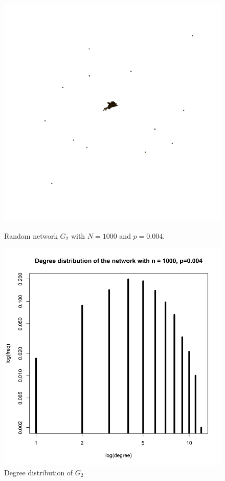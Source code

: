 \documentclass[draftcls,12pt,onecolumn]{IEEEtran}
\begin{document}
\begin{figure}[H]
\centering
\begin{minipage}[t]{0.48\textwidth}
\centering
\includegraphics[scale=0.2]{figures_part1_1/output_4_0.png}
\caption{Random network $G_2$ with $N=1000$ and $p=0.004$.}
\label{fig3}
\end{minipage}
\begin{minipage}[t]{0.48\textwidth}
\centering
\includegraphics[scale=0.2]{figures_part1_1/output_9_0.png}
\caption{Degree distribution of $G_2$}
\label{fig4}
\end{minipage}
\end{figure}
\end{document}
